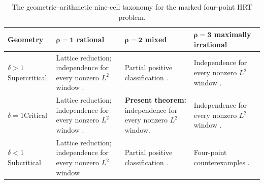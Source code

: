\documentclass[reqno]{amsart}
\theoremstyle{remark}
\numberwithin{equation}{section}
\begin{document}
\begin{table}[htbp]
\centering
\caption{The geometric--arithmetic nine-cell taxonomy for the marked
four-point HRT problem.}
\label{tab:four-point-nine-cell-taxonomy}

\small
\renewcommand{\arraystretch}{1.25}
\begin{tabularx}{0.99\textwidth}{
  >{\raggedright\arraybackslash}p{}
  >{\raggedright\arraybackslash}X
  >{\raggedright\arraybackslash}X
  >{\raggedright\arraybackslash}X}
\toprule
\rowcolor{HRTHeader}
\textbf{Geometry}
& \(\boldsymbol{\rho=1}\) \textbf{rational}
& \(\boldsymbol{\rho=2}\) \textbf{mixed}
& \(\boldsymbol{\rho=3}\) \textbf{maximally irrational}\\
\midrule

\cellcolor{HRTGeometry}\(\delta>1\)\newline Supercritical
& \cellcolor{HRTPositive}
  Lattice reduction; independence for every nonzero \(L^2\) window
  \cite{Linnell}.
& \cellcolor{HRTPartial}
  Partial positive classification \cite{OussaTrichotomy}.
& \cellcolor{HRTPositive}
  Independence for every nonzero \(L^2\) window
  \cite{OussaCertified}.\\

\cellcolor{HRTGeometry}\(\delta=1\)\newline Critical
& \cellcolor{HRTPositive}
  Lattice reduction; independence for every nonzero \(L^2\) window
  \cite{Linnell}.
& \cellcolor{HRTPresent}
  \textbf{Present theorem:} independence for every nonzero \(L^2\) window.
& \cellcolor{HRTPositive}
  Independence for every nonzero \(L^2\) window
  \cite{OussaCriticalRankThree}.\\

\cellcolor{HRTGeometry}\(\delta<1\)\newline Subcritical
& \cellcolor{HRTPositive}
  Lattice reduction; independence for every nonzero \(L^2\) window
  \cite{Linnell}.
& \cellcolor{HRTPartial}
  Partial positive classification \cite{OussaTrichotomy}.
& \cellcolor{HRTCounter}
  Four-point counterexamples
  \cite{OussaCounterexample,DaiEtAl}.\\
\bottomrule
\end{tabularx}

\vspace{4pt}
\footnotesize
{}\quad
{}\\[3pt]
\quad
{}
\end{table}
\end{document}
